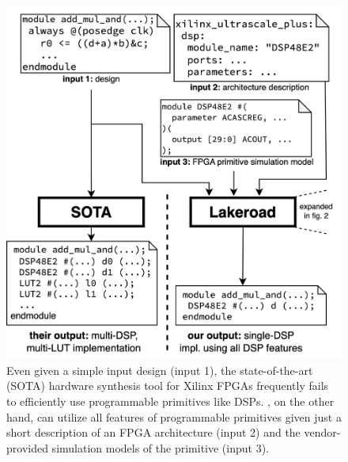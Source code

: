 \begin{figure}
\centering
\includegraphics[width=0.7\columnwidth]{lakeroad/assets/lakeroad-firstpage.drawio.png}

\vspace{-3mm}
\caption{
Even given a simple input
  design (input 1),
  the state-of-the-art (SOTA)
  hardware synthesis tool
  for Xilinx FPGAs
  frequently
  fails to efficiently use 
  programmable primitives
  like DSPs.
\lr,
  on the other hand,
  can utilize all features
  of programmable primitives
  given just a short description
  of an FPGA architecture (input 2)
  and the vendor-provided 
  simulation models
  of the primitive (input 3).\tighten
}
\label{fig:firstpage}

\end{figure}
